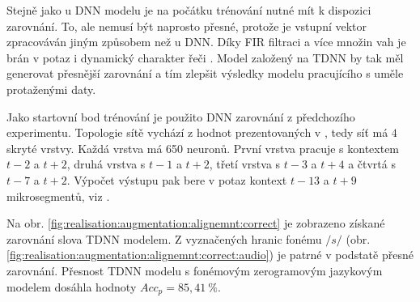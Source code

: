 
Stejně jako u DNN modelu je na počátku trénování nutné mít k dispozici zarovnání. To, ale nemusí být naprosto přesné, protože je vstupní vektor zpracováván jiným způsobem než u DNN. Díky FIR filtraci a více množin vah je brán v potaz i dynamický charakter řeči \cite{Peddinti2015}. Model založený na TDNN by tak měl generovat přesnější zarovnání a tím zlepšit výsledky modelu pracujícího s uměle protaženými daty.

Jako startovní bod trénování je použito DNN zarovnání z předchozího experimentu. Topologie sítě vychází z hodnot prezentovaných v \cite{Peddinti2015}, tedy síť má $4$ skryté vrstvy. Každá vrstva má 650 neuronů. První vrstva pracuje s kontextem $t-2$ a $t+2$, druhá vrstva s $t-1$ a $t+2$, třetí vrstva s $t-3$ a $t+4$ a čtvrtá s $t-7$ a $t+2$. Výpočet výstupu pak bere v potaz kontext $t-13$ a $t+9$ mikrosegmentů, viz \cite{Peddinti2015}.


Na obr. \ref{fig:realisation:augmentation:alignemnt:correct} je zobrazeno získané zarovnání slova  TDNN modelem. Z vyznačených hranic fonému $/s/$ (obr. \ref{fig:realisation:augmentation:alignemnt:correct:audio}) je patrné v podstatě přesné zarovnání. Přesnost TDNN modelu s fonémovým zerogramovým jazykovým modelem dosáhla hodnoty $Acc_{p}= 85,41\ \%$.

